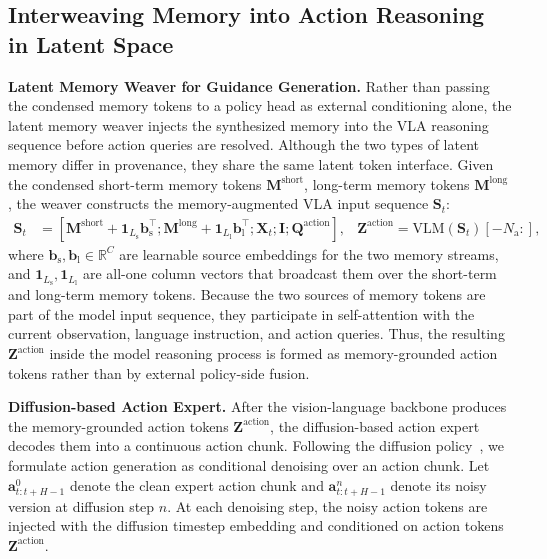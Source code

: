 \subsection{Interweaving Memory into Action Reasoning in Latent Space}
\label{sec:weaver}
\noindent\textbf{Latent Memory Weaver for Guidance Generation.}
Rather than passing the condensed memory tokens to a policy head as external conditioning alone, the latent memory weaver injects the synthesized memory into the VLA reasoning sequence before action queries are resolved.
Although the two types of latent memory differ in provenance, they share the same latent token interface.
Given the condensed short-term memory tokens $\bm{M}^\text{short}$, long-term memory tokens $\bm{M}^\text{long}$, the weaver constructs the memory-augmented VLA input sequence $\bm{S}_t$:
\begin{equation}
    \label{eq:memory_weaver}
    \begin{aligned}
        \bm{S}_t &=
        [\bm{M}^\text{short} + \mathbf{1}_{L_\text{s}}\bm{b}_\text{s}^\top;
        \bm{M}^\text{long} + \mathbf{1}_{L_\text{l}}\bm{b}_\text{l}^\top;
        \bm{X}_t; \bm{I};
        \bm{Q}^\text{action}],  &      \bm{Z}^\text{action}= \mathrm{VLM}(\bm{S}_t)[-N_\text{a}:],
    \end{aligned}
\end{equation}
where $\bm{b}_\text{s},\bm{b}_\text{l}\in\mathbb{R}^{C}$ are learnable source embeddings for the two memory streams, and $\mathbf{1}_{L_\text{s}},\mathbf{1}_{L_\text{l}}$ are all-one column vectors that broadcast them over the short-term and long-term memory tokens.
Because the two sources of memory tokens are part of the model input sequence, they participate in self-attention with the current observation, language instruction, and action queries.
Thus, the resulting $\bm{Z}^\text{action}$ inside the model reasoning process is formed as memory-grounded action tokens rather than by external policy-side fusion.

\noindent\textbf{Diffusion-based Action Expert.}
After the vision-language backbone produces the memory-grounded action tokens $\bm{Z}^\text{action}$, the diffusion-based action expert decodes them into a continuous action chunk.
Following the diffusion policy~\cite{chi2025diffusion}, we formulate action generation as conditional denoising over an action chunk.
Let $\bm{a}_{t:t+H-1}^{0}$ denote the clean expert action chunk and $\bm{a}_{t:t+H-1}^{n}$ denote its noisy version at diffusion step $n$.
At each denoising step, the noisy action tokens are injected with the diffusion timestep embedding and conditioned on action tokens $\bm{Z}^\text{action}$.

